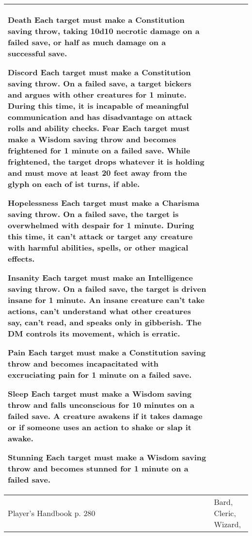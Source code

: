 \documentclass[11pt]{report}
\begin{document}
\begin{table}[H]
\begin{tabular}{||p{6cm}|p{6cm}||}
{Death
Each target must make a Constitution saving throw, taking 10d10 necrotic damage on a failed save, or half as much damage on a successful save.

Discord
Each target must make a Constitution saving throw. On a failed save, a target bickers and argues with other creatures for 1 minute. During this time, it is incapable of meaningful communication and has disadvantage on attack rolls and ability checks.
Fear
Each target must make a Wisdom saving throw and becomes frightened for 1 minute on a failed save. While frightened, the target drops whatever it is holding and must move at least 20 feet away from the glyph on each of ist turns, if able. 

Hopelessness
Each target must make a Charisma saving throw. On a failed save, the target is overwhelmed with despair for 1 minute. During this time, it can't attack or target any creature with harmful abilities, spells, or other magical effects.

Insanity
Each target must make an Intelligence saving throw. On a failed save, the target is driven insane for 1 minute. An insane creature can't take actions, can't understand what other creatures say, can't read, and speaks only in gibberish. The DM controls its movement, which is erratic.

Pain
Each target must make a Constitution saving throw and becomes incapacitated with excruciating pain for 1 minute on a failed save.

Sleep
Each target must make a Wisdom saving throw and falls unconscious for 10 minutes on a failed save. A creature awakens if it takes damage or if someone uses an action to shake or slap it awake.

Stunning
Each target must make a Wisdom saving throw and becomes stunned for 1 minute on a failed save.}\\ \hline
Player's Handbook p. 280 & Bard, Cleric, Wizard, \\ \hline\hline
	\end{tabular}
\end{table}
\end{document}
